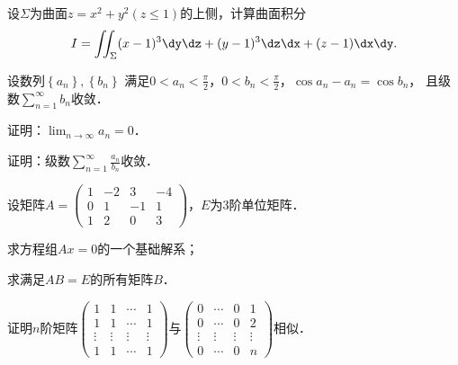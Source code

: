 \documentclass[plain,noanswer,medmath]{../../template/jnuexam}
\begin{document}
\begin{problem}[points=10]
设$\Sigma$为曲面$z = x^2 + y^2$$(z \le 1)$的上侧，计算曲面积分
$$I = \iint_{\Sigma}(x - 1)^3 \dy\dz + (y - 1)^3 \dz\dx + (z - 1)\dx\dy.$$
\end{problem}


\begin{problem}[points=10]
设数列$\left\{a_n \right\},\left\{b_n \right\}$
满足$0 < a_n < \frac{\pi}{2}$，$0 < b_n < \frac{\pi}{2}$，$\cos a_n - a_n = \cos b_n$，
且级数$\sum_{n = 1}^{\infty}b_n$收敛．
\begin{enumerate*}
\item 证明：$\lim_{n \to \infty} a_n = 0$．
\item 证明：级数$\sum_{n = 1}^{\infty}\frac{a_n}{b_n}$收敛．
\end{enumerate*}
\end{problem}


\begin{problem}[points=11]
设矩阵$A = \begin{pmatrix}
  1 & -2 &  3 & -4 \\
  0 &  1 & -1 & 1 \\
  1 &  2 &  0 & 3
\end{pmatrix}$，$E$为$3$阶单位矩阵．\par
\begin{enumerate*}
\item 求方程组$Ax = 0$的一个基础解系；
\item 求满足$AB = E$的所有矩阵$B$．
\end{enumerate*}
\end{problem}


\begin{problem}[points=11]
证明$n$阶矩阵$\begin{pmatrix}
       1 &      1 & \cdots & 1 \\
       1 &      1 & \cdots & 1 \\
  \vdots & \vdots & \vdots & \vdots \\
       1 &      1 & \cdots & 1
\end{pmatrix}$与$\begin{pmatrix}
       0 & \cdots &      0 & 1 \\
       0 & \cdots &      0 & 2 \\
  \vdots & \vdots & \vdots & \vdots \\
       0 & \cdots &      0 & n
\end{pmatrix}$相似．
\end{problem}
\end{document}
